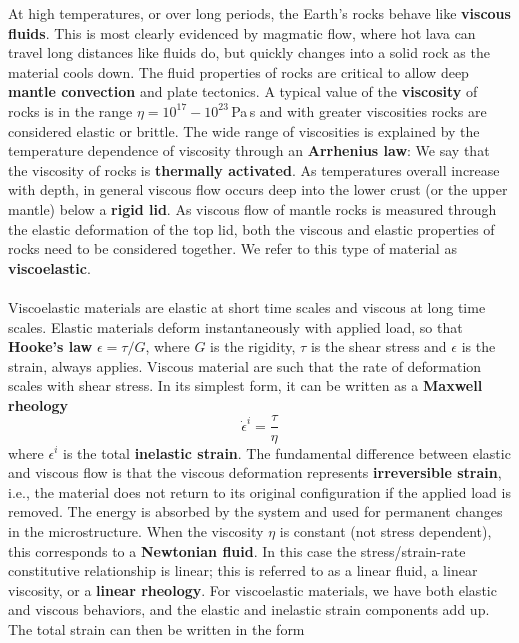 \documentclass[letterpaper,12pt,]{memoir}
\begin{document}
At high temperatures, or over long periods, the Earth's rocks behave like \textbf{viscous fluids}. This is most clearly evidenced by magmatic flow, where hot lava can travel long distances like fluids do, but quickly changes into a solid rock as the material cools down. The fluid properties of rocks are critical to allow deep \textbf{mantle convection} and plate tectonics. A typical value of the \textbf{viscosity} of rocks is in the range $\eta=10^{17}-10^{23}\,$Pa\,s and with greater viscosities rocks are considered elastic or brittle. The wide range of viscosities is explained by the temperature dependence of viscosity through an \textbf{Arrhenius law}: We say that the viscosity of rocks is \textbf{thermally activated}. As temperatures overall increase with depth, in general viscous flow occurs deep into the lower crust (or the upper mantle) below a \textbf{rigid lid}. As viscous flow of mantle rocks is measured through the elastic deformation of the top lid, both the viscous and elastic properties of rocks need to be considered together. We refer to this type of material as \textbf{viscoelastic}. \\
\\
Viscoelastic materials are elastic at short time scales and viscous at long time scales. Elastic materials deform instantaneously with applied load, so that \textbf{Hooke's law} $\epsilon=\tau/G$, where $G$ is the rigidity, $\tau$ is the shear stress and $\epsilon$ is the strain, always applies. Viscous material are such that the rate of deformation scales with shear stress. In its simplest form, it can be written as a \textbf{Maxwell rheology}
\begin{equation}
\dot{\epsilon}^i=\frac{\tau}{\eta}
\end{equation}
where $\epsilon^i$ is the total \textbf{inelastic strain}. The fundamental difference between elastic and viscous flow is that the viscous deformation represents \textbf{irreversible strain}, i.e., the material does not return to its original configuration if the applied load is removed. The energy is absorbed by the system and used for permanent changes in the microstructure. When the viscosity $\eta$ is constant (not stress dependent), this corresponds to a \textbf{Newtonian fluid}. In this case the stress/strain-rate constitutive relationship is linear; this is referred to as a linear fluid, a linear viscosity, or a \textbf{linear rheology}. For viscoelastic materials, we have both elastic and viscous behaviors, and the elastic and inelastic strain components add up. The total strain can then be written in the form
\end{document}
